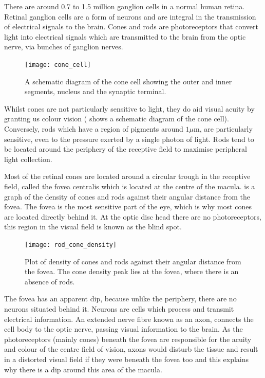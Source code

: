 There are around 0.7 to 1.5 million ganglion cells in a normal human retina.
\cite{curcio1990topography} Retinal ganglion cells are a form of neurons
and are integral in the transmission of electrical signals to the brain.
\cite{meyer1995characterization} Cones and rods are photoreceptors
that convert light into electrical signals which are transmitted to the
brain from the optic nerve, via bunches of ganglion nerves.

\begin{figure}[H]
\centering
  \texttt{[image: cone\_cell]}
\caption{A schematic diagram of the cone cell showing the outer and inner
segments, nucleus and the synaptic terminal.\cite{wikicone}}
\label{fig:cone}
\end{figure}

Whilst cones are not particularly sensitive to light, they do aid visual
acuity by granting us colour vision ( shows a schematic
diagram of the cone cell).\cite{bowmaker1980visual} Conversely, rods
which have a region of pigments around $1\mu\textrm{m}$, are particularly
sensitive, even to the pressure exerted by a single photon of light.
Rods tend to be located around the periphery of the receptive field to
maximise peripheral light collection.
\cite{liebman1964sensitive,baylor1979responses}

Most of the retinal cones are located around a circular trough in the
receptive field, called the fovea centralis which is located at the centre
of the macula.\cite{hendrickson1994primate}
 is a graph of the density of cones and rods
against their angular distance from the fovea. The fovea is the most
sensitive part of the eye, which is why most cones are located directly
behind it. At the optic disc head there are no photoreceptors, this region
in the visual field is known as the blind spot.

\begin{figure}[H]
\centering
  \texttt{[image: rod\_cone\_density]}
\caption{Plot of density of cones and rods against their angular distance from
the fovea. The cone density peak lies at the fovea, where there is an absence
of rods.\cite{yannuzzi2011retinal}}
\label{fig:rod_cone_density}
\end{figure}

The fovea has an apparent dip, because unlike the periphery, there are
no neurons situated behind it. Neurons are cells which process and
transmit electrical information. An extended nerve fibre known as an axon,
connects the cell body to the optic nerve, passing visual information to the
brain. As the photoreceptors (mainly cones) beneath the fovea are responsible
for the acuity and colour of the centre field of vision, axons would disturb the
tissue and result in a distorted visual field if they were beneath the fovea too
and this explains why there is a dip around this area of the macula.
 
